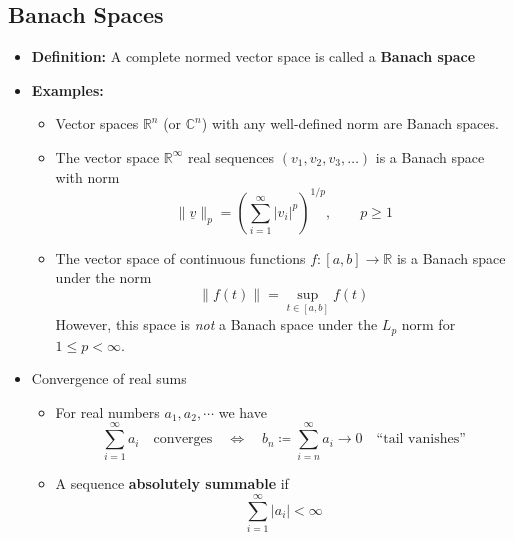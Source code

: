\documentclass[11pt,twoside]{report}
\newcommand{\vecnot}{\underline}
\begin{document}
\subsection{Banach Spaces} 

\begin{itemize}
\item \textbf{Definition:} A complete normed vector space is called a \textbf{Banach space}

\item \textbf{Examples:}
\begin{itemize}
\item Vector spaces $\mathbb{R}^n$ (or $\mathbb{C}^n$) with any well-defined norm are Banach spaces.

\item The vector space  $\mathbb{R}^\infty$ real sequences $(v_1,v_2,v_3,\ldots)$ is a Banach space with norm 
\[
 \|\vecnot{v} \|_p = \left(\sum_{i=1}^\infty |v_i |^p \right)^{1/p}, \qquad p \ge 1
\]


\item The vector space of continuous functions $f \colon [a,b] \to \mathbb{R}$ is a Banach space under the norm 
\[ \left\| f(t) \right\| = \sup_{t\in [a,b]} f(t)
 \]
 However, this space is \emph{not} a Banach space under the $L_p$ norm for $1 \le p < \infty$. 
\end{itemize}






\item Convergence of real sums
\begin{itemize}
\item For real numbers $a_1, a_2, \cdots $ we have
\[
\sum_{i=1}^\infty a_i \quad \text{converges}  \quad \iff \quad b_n \coloneqq \sum_{i=n}^\infty a_i  \to 0 \quad \text{``tail vanishes''} 
\]

\item A sequence \textbf{absolutely summable} if 
\[
\sum_{i=1}^\infty |a_i| < \infty %
\]




\end{itemize}
\end{itemize}
\end{document}
